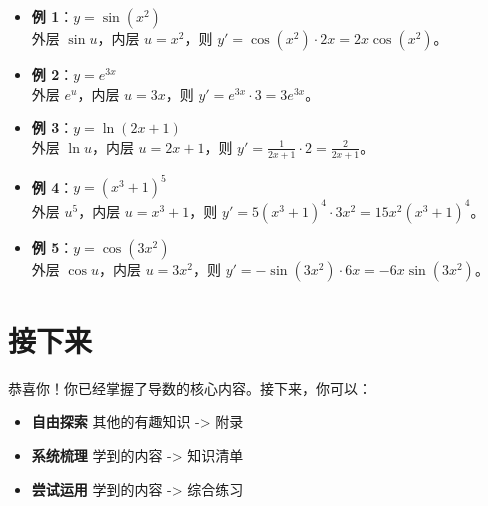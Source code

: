 \documentclass[10pt]{article}
\begin{document}
\begin{itemize}
    \item \textbf{例 1}：$y = \sin(x^2)$ \\
    外层 $\sin u$，内层 $u = x^2$，则 $y' = \cos(x^2) \cdot 2x = 2x \cos(x^2)$。
    \item \textbf{例 2}：$y = e^{3x}$ \\
    外层 $e^u$，内层 $u = 3x$，则 $y' = e^{3x} \cdot 3 = 3e^{3x}$。
    \item \textbf{例 3}：$y = \ln(2x+1)$ \\
    外层 $\ln u$，内层 $u = 2x+1$，则 $y' = \frac{1}{2x+1} \cdot 2 = \frac{2}{2x+1}$。
    \item \textbf{例 4}：$y = (x^3+1)^5$ \\
    外层 $u^5$，内层 $u = x^3+1$，则 $y' = 5(x^3+1)^4 \cdot 3x^2 = 15x^2 (x^3+1)^4$。
    \item \textbf{例 5}：$y = \cos(3x^2)$ \\
    外层 $\cos u$，内层 $u = 3x^2$，则 $y' = -\sin(3x^2) \cdot 6x = -6x \sin(3x^2)$。
\end{itemize}

\section*{接下来}

恭喜你！你已经掌握了导数的核心内容。接下来，你可以：

\begin{itemize}
    \item \textbf{自由探索} 其他的有趣知识 -> 附录
    \item \textbf{系统梳理} 学到的内容 -> 知识清单
    \item \textbf{尝试运用} 学到的内容 -> 综合练习
\end{itemize}
\end{document}
